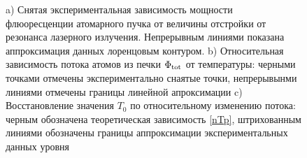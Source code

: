 \begin{figure}[ht]
    \centering
    \hspace{5 mm} 
    \vspace{-3mm}
    \caption{a) Снятая экспериментальная зависимость мощности флюоресценции атомарного пучка от величины отстройки от резонанса лазерного излучения. Непрерывным линиями показана аппроксимация данных лоренцовым контуром. b) Относительная зависимость потока атомов из печки $\Phi_{\textnormal{tot}}$ от температуры: черными точками отмечены экспериментально снаятые точки, непрерывынми линиями отмечены границы линейной апроксимации  c) Восстановление значения $T_0$ по относительному изменению потока: черным обозначена теоретическая зависимость \eqref{nTp}, штрихованным линиями обозначены границы аппроксимации экспериментальных данных уровня}
    \label{fig:oven}
\end{figure}


